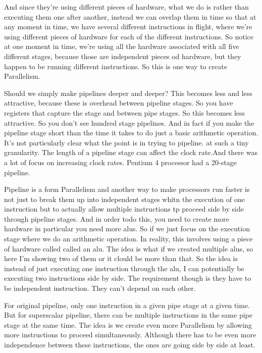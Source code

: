 And since they're using different pieces of hardware, what we do is rather than executing them 
one after another, instead we can overlap them in time so that at any moment in time, we have 
several different instructions in flight, where we're using different pieces of hardware for each 
of the different instructions. So notice at one moment in time, we're using all the hardware
associated with all five different stages, because those are independent pieces od hardware, but
they happen to be running different instructions. So this is one way to create Parallelism.

Should we simply make pipelines deeper and deeper? This becomes less and less attractive, 
because these is overhead between pipeline stages. So you have registers that capture the 
stage and between pipe stages. So this becomes less attractive. So you don't see hundred stage
pipelines. And in fact if you make the pipeline stage short than the time it takes to do just
a basic arithmetic operation. It's not particularly clear what the point is in trying to pipeline.
at such a tiny granularity. The length of a pipeline stage can affect the clock rate.And there 
was a lot of focus on increasing clock rates. Pentium 4 processor had a 20-stage pipeline.

Pipeline is a form Parallelism and another way to make processors run faster is not just to break them up into independent stages whitn the execution of one instruction but to actually allow multiple instructions tp proceed side by side through pipeline stages.
And in order todo this, you need to create more hardware in particular you need more alus. 
So if we just focus on the execution stage where we do an arithmetic operation.
In reality, this involves using a piece of hardware called called an alu. The idea is 
what if we created multiple alus, so here I'm showing two of them or it clould be more 
than that. So the idea is instead of just executing one instruction through the alu,
I can potentially be executing two instructions side by side. 
The requirement though is they have to be independent instruction. They can't depend
on each other.

For original pipeline, only one instruction in a given pipe stage at a given time.
But for superscalar pipeline, there can be multiple instructions in the same pipe
stage at the same time. The idea is we create even more Parallelism by allowing more 
instructions to proceed simultaneously. Although there has to be even more independence
between these instructions, the ones are going side by side at least. 
 
